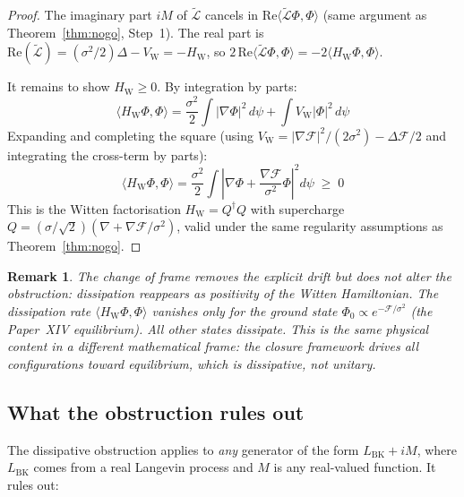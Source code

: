 \documentclass[12pt]{article}
\newtheorem{remark}[theorem]{Remark}
\newcommand{\Fcal}{\mathcal{F}}
\newcommand{\Lcal}{\mathcal{L}}
\begin{document}
\begin{proof}
The imaginary part $iM$ of $\tilde{\Lcal}$ cancels in $\mathrm{Re}\langle\tilde{\Lcal}\Phi,\Phi\rangle$ (same argument as Theorem~\ref{thm:nogo}, Step~1). The real part is $\mathrm{Re}(\tilde{\Lcal}) = (\sigma^2/2)\Delta - V_{\mathrm{W}} = -H_{\mathrm{W}}$, so $2\,\mathrm{Re}\langle \tilde{\Lcal}\Phi,\Phi\rangle = -2\langle H_{\mathrm{W}}\Phi,\Phi\rangle$.

It remains to show $H_{\mathrm{W}} \geq 0$. By integration by parts:
\begin{equation}
    \langle H_{\mathrm{W}}\Phi,\Phi\rangle = \frac{\sigma^2}{2}\int|\nabla\Phi|^2\,d\psi + \int V_{\mathrm{W}}|\Phi|^2\,d\psi
\end{equation}
Expanding and completing the square (using $V_{\mathrm{W}} = |\nabla\Fcal|^2/(2\sigma^2) - \Delta\Fcal/2$ and integrating the cross-term by parts):
\begin{equation}
    \langle H_{\mathrm{W}}\Phi,\Phi\rangle = \frac{\sigma^2}{2}\int\left|\nabla\Phi + \frac{\nabla\Fcal}{\sigma^2}\Phi\right|^2 d\psi \;\geq\; 0
\end{equation}
This is the Witten factorisation $H_{\mathrm{W}} = Q^\dagger Q$ with supercharge $Q = (\sigma/\sqrt{2})(\nabla + \nabla\Fcal/\sigma^2)$, valid under the same regularity assumptions as Theorem~\ref{thm:nogo}.
\end{proof}

\begin{remark}
The change of frame removes the explicit drift but does not alter the obstruction: dissipation reappears as positivity of the Witten Hamiltonian. The dissipation rate $\langle H_{\mathrm{W}}\Phi,\Phi\rangle$ vanishes only for the ground state $\Phi_0 \propto e^{-\Fcal/\sigma^2}$ (the Paper~XIV equilibrium). All other states dissipate. This is the same physical content in a different mathematical frame: the closure framework drives all configurations toward equilibrium, which is dissipative, not unitary.
\end{remark}

\subsection{What the obstruction rules out}

The dissipative obstruction applies to \textit{any} generator of the form $L_{\mathrm{BK}} + iM$, where $L_{\mathrm{BK}}$ comes from a real Langevin process and $M$ is any real-valued function. It rules out:
\end{document}
